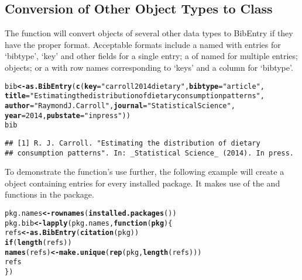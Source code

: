 \documentclass[article]{jss}\usepackage[]{graphicx}\usepackage[]{color}
\makeatletter
\newcommand{\hlnum}[1]{\textcolor[rgb]{0.125,0.125,1}{#1}}%
\newcommand{\hlstr}[1]{\textcolor[rgb]{0.125,0.125,1}{#1}}%
\newcommand{\hlstd}[1]{\textcolor[rgb]{0.251,0.251,0.282}{#1}}%
\newcommand{\hlkwa}[1]{\textcolor[rgb]{0,0.533,0.345}{\textbf{#1}}}%
\newcommand{\hlkwb}[1]{\textcolor[rgb]{0.439,0.251,1}{\textbf{#1}}}%
\newcommand{\hlkwc}[1]{\textcolor[rgb]{0.529,0,0.184}{\textbf{#1}}}%
\newcommand{\hlkwd}[1]{\textcolor[rgb]{0.251,0.251,0.282}{\textbf{#1}}}%
\newenvironment{kframe}{%
 \def\at@end@of@kframe{}%
 \ifinner\ifhmode%
  \def\at@end@of@kframe{\end{minipage}}%
  \begin{minipage}{\columnwidth}%
 \fi\fi%
 \def\FrameCommand##1{\hskip\@totalleftmargin \hskip-\fboxsep
 \colorbox{shadecolor}{##1}\hskip-\fboxsep
     \hskip-\linewidth \hskip-\@totalleftmargin \hskip\columnwidth}%
 \MakeFramed {\advance\hsize-\width
   \@totalleftmargin\z@ \linewidth\hsize
   \@setminipage}}%
 {\par\unskip\endMakeFramed%
 \at@end@of@kframe}
\newenvironment{knitrout}{}{} %
\makeatother
\begin{document}
\subsection[Conversion of Other Object Types to Class BibEntry]{Conversion of Other Object Types to Class }
The  function will convert objects of several other data types to BibEntry if they have the proper format.  Acceptable formats include a named  with entries for `bibtype', `key' and other fields for a single entry; a  of named  for multiple entries;  objects; or a  with row names corresponding to `keys' and a column for `bibtype'.
\begin{knitrout}
\color{fgcolor}\begin{kframe}
\begin{alltt}
\hlstd{bib} \hlkwb{<-} \hlkwd{as.BibEntry}\hlstd{(}\hlkwd{c}\hlstd{(}\hlkwc{key} \hlstd{=} \hlstr{"carroll2014dietary"}\hlstd{,} \hlkwc{bibtype} \hlstd{=} \hlstr{"article"}\hlstd{,}
  \hlkwc{title} \hlstd{=} \hlstr{"Estimating the distribution of dietary consumption patterns"}\hlstd{,}
  \hlkwc{author} \hlstd{=} \hlstr{"Raymond J. Carroll"}\hlstd{,} \hlkwc{journal} \hlstd{=} \hlstr{"Statistical Science"}\hlstd{,}
  \hlkwc{year} \hlstd{=} \hlnum{2014}\hlstd{,} \hlkwc{pubstate} \hlstd{=} \hlstr{"inpress"}\hlstd{))}
\hlstd{bib}
\end{alltt}
\begin{verbatim}
## [1] R. J. Carroll. "Estimating the distribution of dietary
## consumption patterns". In: _Statistical Science_ (2014). In press.
\end{verbatim}
\end{kframe}
\end{knitrout}


To demonstrate the function's use further, the following example will create a  object containing entries for every installed \R{} package.  It makes use of the  and  functions in the  package.
\begin{knitrout}
\color{fgcolor}\begin{kframe}
\begin{alltt}
\hlstd{pkg.names} \hlkwb{<-} \hlkwd{rownames}\hlstd{(}\hlkwd{installed.packages}\hlstd{())}
\hlstd{pkg.bib} \hlkwb{<-} \hlkwd{lapply}\hlstd{(pkg.names,} \hlkwa{function}\hlstd{(}\hlkwc{pkg}\hlstd{)\{}
  \hlstd{refs} \hlkwb{<-} \hlkwd{as.BibEntry}\hlstd{(}\hlkwd{citation}\hlstd{(pkg))}
  \hlkwa{if} \hlstd{(}\hlkwd{length}\hlstd{(refs))}
    \hlkwd{names}\hlstd{(refs)} \hlkwb{<-} \hlkwd{make.unique}\hlstd{(}\hlkwd{rep}\hlstd{(pkg,} \hlkwd{length}\hlstd{(refs)))}
  \hlstd{refs}
\hlstd{\})}
\end{alltt}
\end{kframe}
\end{knitrout}
\end{document}
